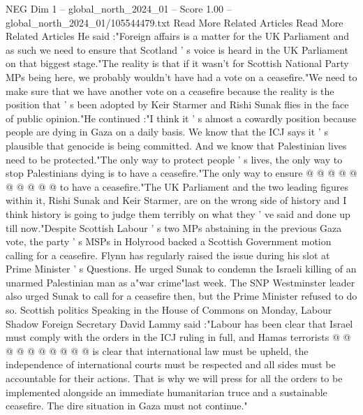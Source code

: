\begin{textsample}{NEG Dim 1 – global\_north\_2024\_01 – Score 1.00 – global\_north\_2024\_01/105544479.txt}  \label{ex:f1_neg_327}
Read More Related Articles Read More Related Articles He said :"Foreign affairs is a matter for the UK Parliament and as such we need to ensure that Scotland ' s voice is heard in the UK Parliament on that biggest stage."The reality is that if it wasn't for Scottish National Party MPs being here, we probably wouldn't have had a vote on a ceasefire."We need to make sure that we have another vote on a ceasefire because the reality is the position that ' s been adopted by Keir Starmer and Rishi Sunak flies in the face of public opinion."He continued :"I think it ' s almost a cowardly position because people are dying in Gaza on a daily basis.
We know that the ICJ says it ' s plausible that genocide is being committed.
And we know that Palestinian lives need to be protected."The only way to protect people ' s lives, the only way to stop Palestinians dying is to have a ceasefire."The only way to ensure @ @ @ @ @ @ @ @ @ @ to have a ceasefire."The UK Parliament and the two leading figures within it, Rishi Sunak and Keir Starmer, are on the wrong side of history and I think history is going to judge them terribly on what they ' ve said and done up till now."Despite Scottish Labour ' s two MPs abstaining in the previous Gaza vote, the party ' s MSPs in Holyrood backed a Scottish Government motion calling for a ceasefire.
Flynn has regularly raised the issue during his slot at Prime Minister ' s Questions.
He urged Sunak to condemn the Israeli killing of an unarmed Palestinian man as a"war crime"last week.
The SNP Westminster leader also urged Sunak to call for a ceasefire then, but the Prime Minister refused to do so.
Scottish politics Speaking in the House of Commons on Monday, Labour Shadow Foreign Secretary David Lammy said :"Labour has been clear that Israel must comply with the orders in the ICJ ruling in full, and Hamas terrorists @ @ @ @ @ @ @ @ @ @ is clear that international law must be upheld, the independence of international courts must be respected and all sides must be accountable for their actions.
That is why we will press for all the orders to be implemented alongside an immediate humanitarian truce and a sustainable ceasefire.
The dire situation in Gaza must not continue."

\end{textsample}

